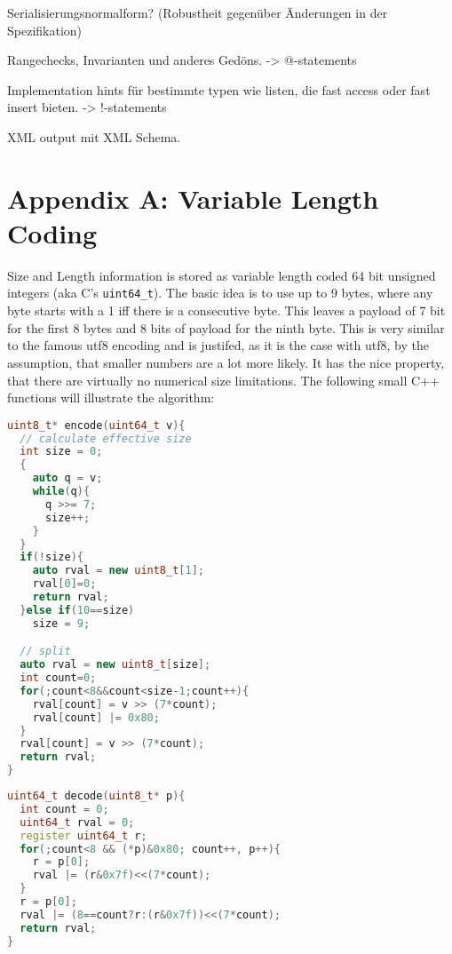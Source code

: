 \documentclass[a4paper,10pt]{article}
\begin{document}
Serialisierungsnormalform? (Robustheit gegenüber Änderungen in der Spezifikation)

Rangechecks, Invarianten und anderes Gedöns. -> @-statements

Implementation hints für bestimmte typen wie listen, die fast access oder fast insert bieten. -> !-statements

XML output mit XML Schema.

\newpage
\todos

\part{Appendix A: Variable Length Coding}

Size and Length information is stored as variable length coded 64 bit unsigned integers (aka C's \texttt{uint64\_t}). The basic idea is to use up to 9 bytes, where any byte starts with a 1 iff there is a consecutive byte. This leaves a payload of 7 bit for the first 8 bytes and 8 bits of payload for the ninth byte. This is very similar to the famous utf8 encoding and is justifed, as it is the case with utf8, by the assumption, that smaller numbers are a lot more likely. It has the nice property, that there are virtually no numerical size limitations.
The following small C++ functions will illustrate the algorithm:
\begin{lstlisting}[label=v64enc,caption=Variable Length Encoding,language=C++]
uint8_t* encode(uint64_t v){
  // calculate effective size
  int size = 0;
  {
    auto q = v;
    while(q){
      q >>= 7;
      size++;
    }
  }
  if(!size){
    auto rval = new uint8_t[1];
    rval[0]=0;
    return rval;
  }else if(10==size)
    size = 9;

  // split
  auto rval = new uint8_t[size];
  int count=0;
  for(;count<8&&count<size-1;count++){
    rval[count] = v >> (7*count);
    rval[count] |= 0x80;
  }
  rval[count] = v >> (7*count);
  return rval;
}
\end{lstlisting}
\begin{lstlisting}[label=v64dec,caption=Variable Length Decoding,language=C++]
uint64_t decode(uint8_t* p){
  int count = 0;
  uint64_t rval = 0;
  register uint64_t r;
  for(;count<8 && (*p)&0x80; count++, p++){
    r = p[0];
    rval |= (r&0x7f)<<(7*count);
  }
  r = p[0];
  rval |= (8==count?r:(r&0x7f))<<(7*count);
  return rval;
}
\end{lstlisting}
\end{document}
